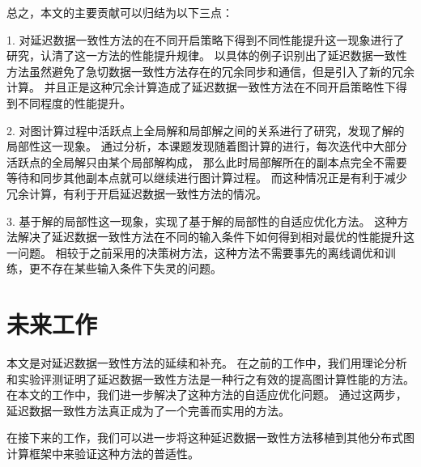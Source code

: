 总之，本文的主要贡献可以归结为以下三点：


1. 对延迟数据一致性方法的在不同开启策略下得到不同性能提升这一现象进行了研究，认清了这一方法的性能提升规律。
以具体的例子识别出了延迟数据一致性方法虽然避免了急切数据一致性方法存在的冗余同步和通信，但是引入了新的冗余计算。
并且正是这种冗余计算造成了延迟数据一致性方法在不同开启策略性下得到不同程度的性能提升。

2. 对图计算过程中活跃点上全局解和局部解之间的关系进行了研究，发现了解的局部性这一现象。
通过分析，本课题发现随着图计算的进行，每次迭代中大部分活跃点的全局解只由某个局部解构成，
那么此时局部解所在的副本点完全不需要等待和同步其他副本点就可以继续进行图计算过程。
而这种情况正是有利于减少冗余计算，有利于开启延迟数据一致性方法的情况。

3. 基于解的局部性这一现象，实现了基于解的局部性的自适应优化方法。
这种方法解决了延迟数据一致性方法在不同的输入条件下如何得到相对最优的性能提升这一问题。
相较于之前采用的决策树方法，这种方法不需要事先的离线调优和训练，更不存在某些输入条件下失灵的问题。

\section{未来工作}

本文是对延迟数据一致性方法的延续和补充。
在之前的工作中，我们用理论分析和实验评测证明了延迟数据一致性方法是一种行之有效的提高图计算性能的方法。
在本文的工作中，我们进一步解决了这种方法的自适应优化问题。
通过这两步，延迟数据一致性方法真正成为了一个完善而实用的方法。

在接下来的工作，我们可以进一步将这种延迟数据一致性方法移植到其他分布式图计算框架中来验证这种方法的普适性。


